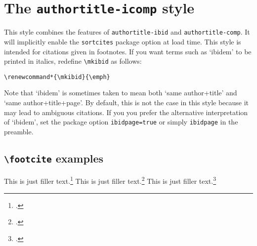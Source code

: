 \documentclass[a4paper]{article}
\newcommand{\cmd}[1]{\texttt{\textbackslash #1}}
\begin{document}
\section*{The \texttt{authortitle-icomp} style}

This style combines the features of \texttt{authortitle-ibid} and
\texttt{authortitle-comp}. It will implicitly enable the
\texttt{sortcites} package option at load time. This style is
intended for citations given in footnotes. If you want terms such as
`ibidem' to be printed in italics, redefine \cmd{mkibid} as follows:

\begin{verbatim}
\renewcommand*{\mkibid}{\emph}
\end{verbatim}
%
Note that `ibidem' is sometimes taken to mean both `same
author+title' and `same author+title+page'. By default, this is not
the case in this style because it may lead to ambiguous citations.
If you you prefer the alternative interpretation of `ibidem', set
the package option \texttt{ibidpage=true} or simply
\texttt{ibidpage} in the preamble.

\subsection*{\cmd{footcite} examples}

This is just filler text.\footcite{aristotle:rhetoric,averroes/bland,aristotle:physics,aristotle:poetics}
This is just filler text.\footcite{aristotle:rhetoric}
This is just filler text.\footcite{aristotle:rhetoric}

\clearpage
\printbibliography
\end{document}
